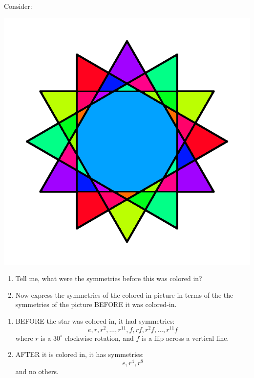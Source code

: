 \documentclass[noauthor,nooutcomes,hints]{ximera}
\begin{document}
\begin{question}
  Consider:
  \begin{center}
    \includegraphics[width=.6\textwidth]{qR3D12.png}
  \end{center}
  \begin{enumerate}
  \item Tell me, what were the symmetries before this was colored in?
  \item Now express the symmetries of the colored-in picture in terms
    of the the symmetries of the picture BEFORE it was colored-in.
  \end{enumerate}
  \begin{freeResponse}
    \begin{enumerate}
    \item BEFORE the star was colored in, it had symmetries:
      \[
      e,r,r^2,\dots,r^{11}, f, rf,r^2f, \dots, r^{11}f
      \]
      where $r$ is a $30^\circ$ clockwise rotation, and $f$ is a flip
      across a vertical line.
    \item AFTER it is colored in, it has symmetries:
      \[
      e, r^4, r^8
      \]
      and no others.
    \end{enumerate}
  \end{freeResponse}
\end{question}
\mynewpage
\end{document}
